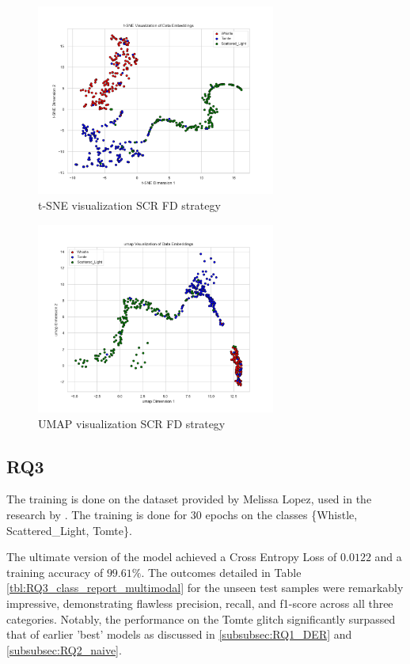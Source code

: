 \begin{figure}[H]
    \centering
    \includegraphics[width=0.7\textwidth]{Images/tSNE_FractalDimension_SCR_test.png}
    \caption{t-SNE visualization SCR FD strategy}
    \label{fig:tsne_FD_SCR}
\end{figure}

\begin{figure}[H]
    \centering
    \includegraphics[width=0.7\textwidth]{Images/umap_FractalDimension_SCR_test.png}
    \caption{UMAP visualization SCR FD strategy}
    \label{fig:umap_FD_SCR}
\end{figure}
\newpage

\subsection{RQ3}
\label{subsub:rq3}
The training is done on the dataset provided by Melissa Lopez, used in the research by \citep{laguarta2023detection, dooney2022dvgan, dooney2024cdvgan}. The training is done for 30 epochs on the classes \{Whistle, Scattered\_Light, Tomte\}. 

The ultimate version of the model achieved a Cross Entropy Loss of $0.0122$ and a training accuracy of $99.61\%$. The outcomes detailed in Table \ref{tbl:RQ3_class_report_multimodal} for the unseen test samples were remarkably impressive, demonstrating flawless precision, recall, and f1-score across all three categories. Notably, the performance on the Tomte glitch significantly surpassed that of earlier 'best' models as discussed in \ref{subsubsec:RQ1_DER} and \ref{subsubsec:RQ2_naive}.

